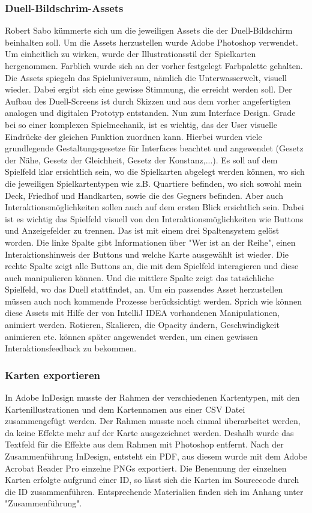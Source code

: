 \subsubsection{Duell-Bildschrim-Assets}
Robert Sabo kümmerte sich um die jeweiligen Assets die der Duell-Bildschirm beinhalten soll. Um die Assets herzustellen wurde Adobe Photoshop verwendet. Um einheitlich zu wirken, wurde der Illustrationsstil der Spielkarten hergenommen. Farblich wurde sich an der vorher festgelegt Farbpalette gehalten. Die Assets spiegeln das Spieluniversum, nämlich die Unterwasserwelt, visuell wieder. Dabei ergibt sich eine gewisse Stimmung, die erreicht werden soll. Der Aufbau des Duell-Screens ist durch Skizzen und aus dem vorher angefertigten analogen und digitalen Prototyp entstanden. 
Nun zum Interface Design. Grade bei so einer komplexen Spielmechanik, ist es wichtig, das der User visuelle Eindrücke der gleichen Funktion zuordnen kann. Hierbei wurden viele grundlegende Gestaltungsgesetze für Interfaces beachtet und angewendet (Gesetz der Nähe, Gesetz der Gleichheit, Gesetz der Konstanz,...). Es soll auf dem Spielfeld klar ersichtlich sein, wo die Spielkarten abgelegt werden können, wo sich die jeweiligen Spielkartentypen wie z.B. Quartiere befinden, wo sich sowohl mein Deck, Friedhof und Handkarten, sowie die des Gegners befinden. Aber auch Interaktionsmöglichkeiten sollen auch auf dem ersten Blick ersichtlich sein. Dabei ist es wichtig das Spielfeld visuell von den Interaktionsmöglichkeiten wie Buttons und Anzeigefelder zu trennen. Das ist mit einem drei Spaltensystem gelöst worden. Die linke Spalte gibt Informationen über "Wer ist an der Reihe", einen Interaktionshinweis der Buttons und welche Karte ausgewählt ist wieder. Die rechte Spalte zeigt alle Buttons an, die mit dem Spielfeld interagieren und diese auch manipulieren können. Und die mittlere Spalte zeigt das tatsächliche Spielfeld, wo das Duell stattfindet, an. Um ein passendes Asset herzustellen müssen auch noch kommende Prozesse berücksichtigt werden. Sprich wie können diese Assets mit Hilfe der von IntelliJ IDEA vorhandenen Manipulationen, animiert werden. Rotieren, Skalieren, die Opacity ändern, Geschwindigkeit animieren etc. können später angewendet werden, um einen gewissen Interaktionsfeedback zu bekommen.

\subsubsection{Karten exportieren}
In Adobe InDesign musste der Rahmen der verschiedenen Kartentypen, mit den Kartenillustrationen und dem Kartennamen aus einer CSV Datei zusammengefügt werden. 
Der Rahmen musste noch einmal überarbeitet werden, da keine Effekte mehr auf der Karte ausgezeichnet werden. Deshalb wurde das Textfeld für die Effekte aus dem Rahmen mit Photoshop entfernt. Nach der Zusammenführung InDesign, entsteht ein PDF, aus diesem wurde mit dem Adobe Acrobat Reader Pro einzelne PNGs exportiert. Die Benennung der einzelnen Karten erfolgte aufgrund einer ID, so lässt sich die Karten im Sourcecode durch die ID zusammenführen.
Entsprechende Materialien finden sich im Anhang unter "Zusammenführung".



